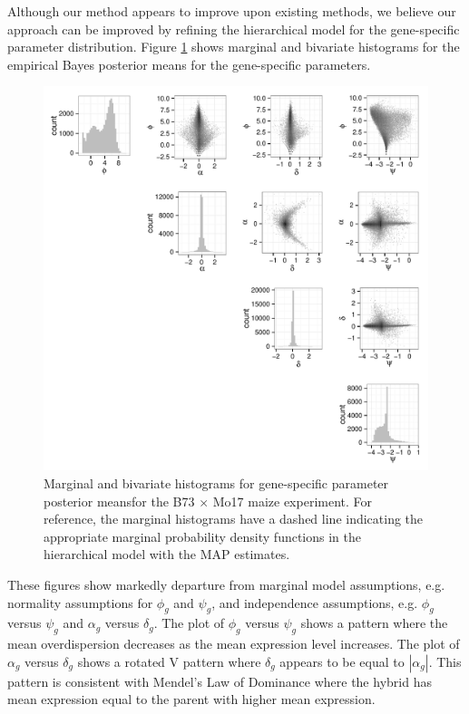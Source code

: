 \documentclass[useAMS,usenatbib,referee]{biom}
\begin{document}
Although our method appears to improve upon existing methods, we believe our approach can be improved by refining the hierarchical model for the gene-specific parameter distribution. Figure \ref{f:scatterplot} shows marginal and bivariate histograms for the empirical Bayes posterior means for the gene-specific parameters. 
\begin{figure}
\centerline{\includegraphics[width=\textwidth]{estimates}}
\caption{Marginal and bivariate histograms for gene-specific parameter posterior meansfor the B73 $\times$ Mo17 maize experiment. For reference, the marginal histograms have a dashed line indicating the appropriate marginal probability density functions in the hierarchical model with the MAP estimates.}
\label{f:scatterplot}
\end{figure}
These figures show markedly departure from marginal model assumptions, e.g. normality assumptions for $\phi_g$ and $\psi_g$, and independence assumptions, e.g. $\phi_g$ versus $\psi_g$ and $\alpha_g$ versus $\delta_g$. The plot of $\phi_g$ versus $\psi_g$ shows a pattern where the mean overdispersion decreases as the mean expression level increases. The plot of $\alpha_g$ versus $\delta_g$ shows a rotated V pattern where $\delta_g$ appears to be equal to $|\alpha_g|$. This pattern is consistent with Mendel's Law of Dominance where the hybrid has mean expression equal to the parent with higher mean expression. 
\end{document}
